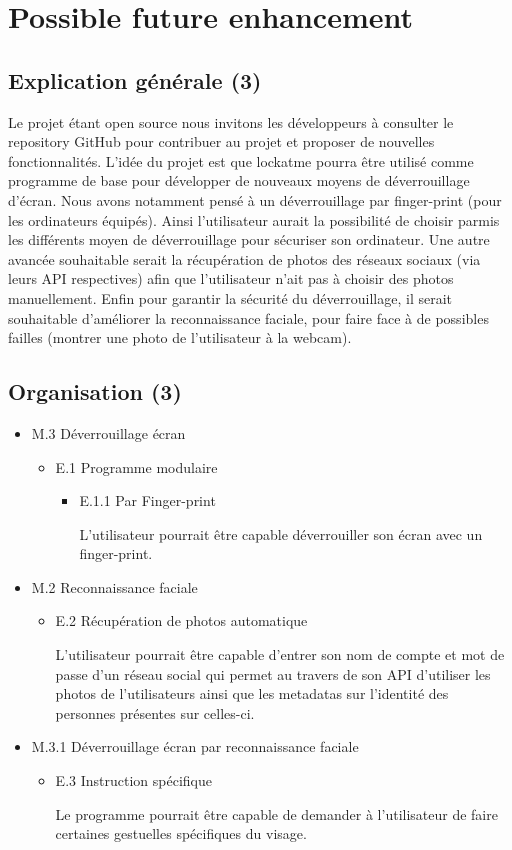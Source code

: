 \section{Possible future enhancement}
  \subsection{Explication générale (3)}
  Le projet étant open source nous invitons les développeurs à consulter le
  repository GitHub pour contribuer au projet et proposer de nouvelles
  fonctionnalités.
  L’idée du projet est que lockatme pourra être utilisé comme programme de
  base pour développer de nouveaux moyens de déverrouillage d’écran. Nous
  avons notamment pensé à un déverrouillage par finger-print (pour les
  ordinateurs équipés). Ainsi l’utilisateur aurait la possibilité de choisir
  parmis les différents moyen de déverrouillage pour sécuriser son ordinateur.
  Une autre avancée souhaitable serait la récupération de photos des réseaux
  sociaux (via leurs API respectives) afin que l’utilisateur n’ait pas à
  choisir des photos manuellement.
  Enfin pour garantir la sécurité du déverrouillage, il serait souhaitable
  d’améliorer la reconnaissance faciale, pour faire face à de possibles
  failles (montrer une photo de l’utilisateur à la webcam).
  \subsection{Organisation (3)}
  \begin{itemize}
  \item{M.3 Déverrouillage écran}
    \begin{itemize}
    \item{E.1 Programme modulaire}
      \begin{itemize}
      \item{E.1.1 Par Finger-print}

      L’utilisateur pourrait être capable déverrouiller son écran avec un
      finger-print.
      \\
      \end{itemize}
    \end{itemize}
    \item{M.2 Reconnaissance faciale}
    \begin{itemize}
    \item{E.2 Récupération de photos automatique}

    L’utilisateur pourrait être capable d’entrer son nom de compte et mot de
    passe d’un réseau social qui permet au travers de son API d’utiliser les
    photos de l’utilisateurs ainsi que les metadatas sur l’identité des
    personnes présentes sur celles-ci.
    \\
    \end{itemize}
    \item{M.3.1 Déverrouillage écran par reconnaissance faciale}
    \begin{itemize}
      \item{E.3 Instruction spécifique}

      Le programme pourrait être capable de demander à l’utilisateur de faire
      certaines gestuelles spécifiques du visage.
    \end{itemize}
  \end{itemize}

